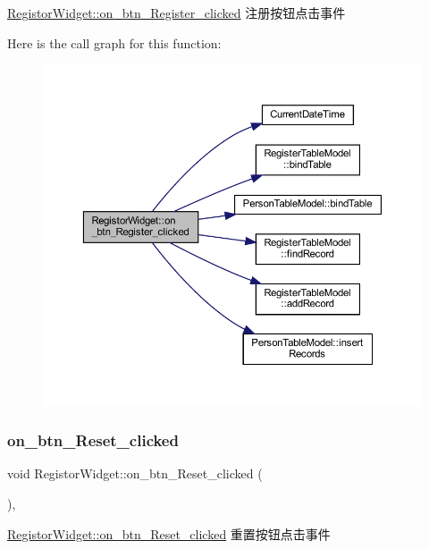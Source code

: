 \mbox{\hyperlink{class_registor_widget_ae280a0ef976dd2835f4a33c60b67e8a9}{Registor\+Widget\+::on\+\_\+btn\+\_\+\+Register\+\_\+clicked}} 注册按钮点击事件 

Here is the call graph for this function\+:
\nopagebreak
\begin{figure}[H]
\begin{center}
\leavevmode
\includegraphics[width=350pt]{class_registor_widget_ae280a0ef976dd2835f4a33c60b67e8a9_cgraph}
\end{center}
\end{figure}
\mbox{\label{class_registor_widget_aea14551286d02e5bdfcbd6d0114382fb}} 
\subsubsection{\texorpdfstring{on\_btn\_Reset\_clicked}{on\_btn\_Reset\_clicked}}
{\footnotesize\ttfamily void Registor\+Widget\+::on\+\_\+btn\+\_\+\+Reset\+\_\+clicked (\begin{DoxyParamCaption}{ }\end{DoxyParamCaption})\hspace{0.3cm}{\ttfamily [private]}, {\ttfamily [slot]}}



\mbox{\hyperlink{class_registor_widget_aea14551286d02e5bdfcbd6d0114382fb}{Registor\+Widget\+::on\+\_\+btn\+\_\+\+Reset\+\_\+clicked}} 重置按钮点击事件 

